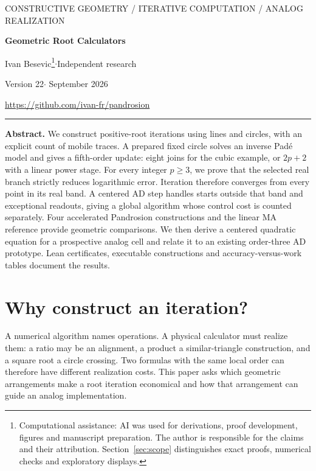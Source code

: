 \documentclass[11pt,a4paper]{article}
\begin{document}
\thispagestyle{empty}
{\small\sffamily\color{accent} CONSTRUCTIVE GEOMETRY / ITERATIVE COMPUTATION / ANALOG REALIZATION}\par
\vspace{8pt}
{\fontsize{24}{27}\selectfont\bfseries\color{ink} Geometric Root Calculators\par}
\vspace{5pt}{\large Fixed circles, global convergence, and analog realization}\par
\vspace{9pt}Ivan Besevic\footnote{Computational assistance: AI was used for derivations, proof development, figures and manuscript preparation. The author is responsible for the claims and their attribution. Section~\ref{sec:scope} distinguishes exact proofs, numerical checks and exploratory displays.}\quad$\cdot$\quad Independent research\par
{\small Version 22\quad$\cdot$ September 2026}\par
\url{https://github.com/ivan-fr/pandrosion}
\vspace{8pt}\hrule\vspace{8pt}
\textbf{Abstract.}
We construct positive-root iterations using lines and circles, with an explicit count of mobile traces. A prepared fixed circle solves an inverse Pad\'e model and gives a fifth-order update: eight joins for the cubic example, or $2p+2$ with a linear power stage. For every integer $p\ge3$, we prove that the selected real branch strictly reduces logarithmic error. Iteration therefore converges from every point in its real band. A centered AD step handles starts outside that band and exceptional readouts, giving a global algorithm whose control cost is counted separately. Four accelerated Pandrosion constructions and the linear MA reference provide geometric comparisons. We then derive a centered quadratic equation for a prospective analog cell and relate it to an existing order-three AD prototype. Lean certificates, executable constructions and accuracy-versus-work tables document the results.

\section{Why construct an iteration?}
A numerical algorithm names operations. A physical calculator must realize them: a ratio may be an alignment, a product a similar-triangle construction, and a square root a circle crossing. Two formulas with the same local order can therefore have different realization costs. This paper asks which geometric arrangements make a root iteration economical and how that arrangement can guide an analog implementation.
\end{document}
